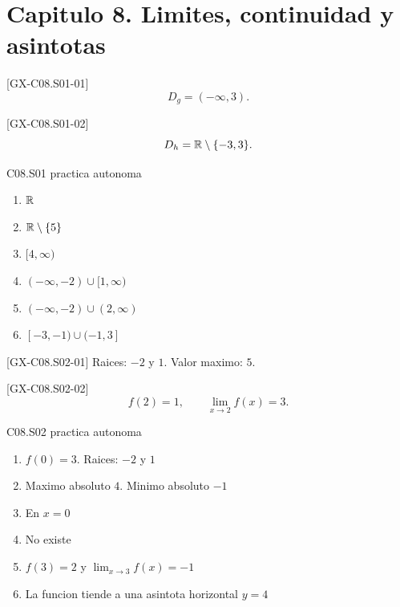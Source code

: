 \section*{Capitulo 8. Limites, continuidad y asintotas}

\begin{shortanswer}{[GX-C08.S01-01]}
\[
D_g=(-\infty,3).
\]
\end{shortanswer}

\begin{shortanswer}{[GX-C08.S01-02]}
\[
D_h=\mathbb{R}\setminus\{-3,3\}.
\]
\end{shortanswer}

\begin{shortanswer}{C08.S01 practica autonoma}
\begin{enumerate}[label=\textbf{PX-C08.S01-\arabic*:}, leftmargin=*]
  \item \(\mathbb{R}\)
  \item \(\mathbb{R}\setminus\{5\}\)
  \item \([4,\infty)\)
  \item \((-\infty,-2)\cup[1,\infty)\)
  \item \((-\infty,-2)\cup(2,\infty)\)
  \item \([-3,-1)\cup(-1,3]\)
\end{enumerate}
\end{shortanswer}

\begin{shortanswer}{[GX-C08.S02-01]}
Raices: \(-2\) y \(1\). Valor maximo: \(5\).
\end{shortanswer}

\begin{shortanswer}{[GX-C08.S02-02]}
\[
f(2)=1,\qquad \lim_{x\to 2}f(x)=3.
\]
\end{shortanswer}

\begin{shortanswer}{C08.S02 practica autonoma}
\begin{enumerate}[label=\textbf{PX-C08.S02-\arabic*:}, leftmargin=*]
  \item \(f(0)=3\). Raices: \(-2\) y \(1\)
  \item Maximo absoluto \(4\). Minimo absoluto \(-1\)
  \item En \(x=0\)
  \item No existe
  \item \(f(3)=2\) y \(\lim_{x\to 3}f(x)=-1\)
  \item La funcion tiende a una asintota horizontal \(y=4\)
\end{enumerate}
\end{shortanswer}

